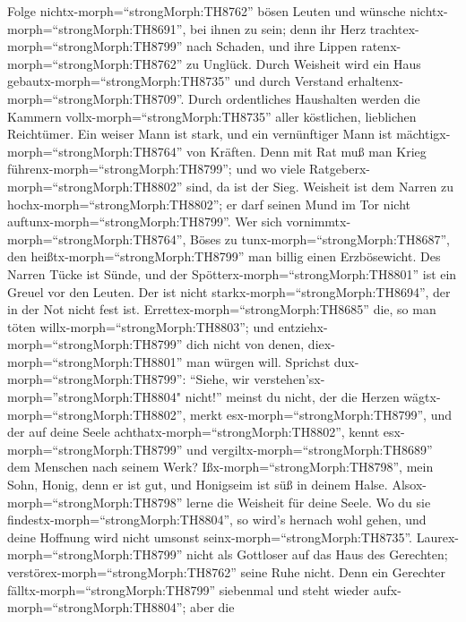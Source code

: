  Folge nichtx-morph=``strongMorph:TH8762'' bösen Leuten und
wünsche nichtx-morph=``strongMorph:TH8691'', bei ihnen zu sein;
 denn ihr Herz trachtex-morph=``strongMorph:TH8799'' nach
Schaden, und ihre Lippen ratenx-morph=``strongMorph:TH8762'' zu Unglück.
 Durch Weisheit wird ein Haus
gebautx-morph=``strongMorph:TH8735'' und durch Verstand
erhaltenx-morph=``strongMorph:TH8709''.  Durch ordentliches
Haushalten werden die Kammern vollx-morph=``strongMorph:TH8735'' aller
köstlichen, lieblichen Reichtümer.  Ein weiser Mann ist
stark, und ein vernünftiger Mann ist
mächtigx-morph=``strongMorph:TH8764'' von Kräften.  Denn mit
Rat muß man Krieg führenx-morph=``strongMorph:TH8799''; und wo viele
Ratgeberx-morph=``strongMorph:TH8802'' sind, da ist der Sieg.
 Weisheit ist dem Narren zu
hochx-morph=``strongMorph:TH8802''; er darf seinen Mund im Tor nicht
auftunx-morph=``strongMorph:TH8799''.  Wer sich
vornimmtx-morph=``strongMorph:TH8764'', Böses zu
tunx-morph=``strongMorph:TH8687'', den
heißtx-morph=``strongMorph:TH8799'' man billig einen Erzbösewicht.
 Des Narren Tücke ist Sünde, und der
Spötterx-morph=``strongMorph:TH8801'' ist ein Greuel vor den Leuten.
 Der ist nicht starkx-morph=``strongMorph:TH8694'', der in
der Not nicht fest ist. 
Errettex-morph=``strongMorph:TH8685'' die, so man töten
willx-morph=``strongMorph:TH8803''; und
entziehx-morph=``strongMorph:TH8799'' dich nicht von denen,
diex-morph=``strongMorph:TH8801'' man würgen will. 
Sprichst dux-morph=``strongMorph:TH8799'': ``Siehe, wir
verstehen'sx-morph=''strongMorph:TH8804" nicht!'' meinst du nicht, der
die Herzen wägtx-morph=``strongMorph:TH8802'', merkt
esx-morph=``strongMorph:TH8799'', und der auf deine Seele
achthatx-morph=``strongMorph:TH8802'', kennt
esx-morph=``strongMorph:TH8799'' und
vergiltx-morph=``strongMorph:TH8689'' dem Menschen nach seinem Werk?
 Ißx-morph=``strongMorph:TH8798'', mein Sohn, Honig, denn
er ist gut, und Honigseim ist süß in deinem Halse. 
Alsox-morph=``strongMorph:TH8798'' lerne die Weisheit für deine Seele.
Wo du sie findestx-morph=``strongMorph:TH8804'', so wird's hernach wohl
gehen, und deine Hoffnung wird nicht umsonst
seinx-morph=``strongMorph:TH8735''. 
Laurex-morph=``strongMorph:TH8799'' nicht als Gottloser auf das Haus des
Gerechten; verstörex-morph=``strongMorph:TH8762'' seine Ruhe nicht.
 Denn ein Gerechter fälltx-morph=``strongMorph:TH8799''
siebenmal und steht wieder aufx-morph=``strongMorph:TH8804''; aber die
